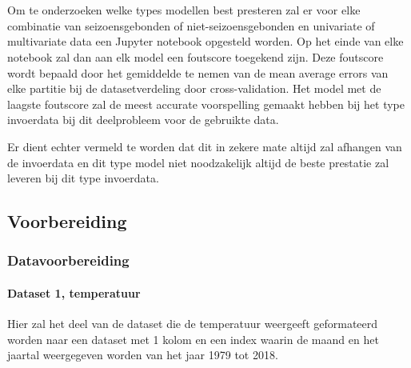 \chapter{}
\label{ch:methodologie}

Om te onderzoeken welke types modellen best presteren zal er voor elke combinatie van seizoensgebonden of niet-seizoensgebonden en univariate of multivariate data een Jupyter notebook opgesteld worden. Op het einde van elke notebook zal dan aan elk model een foutscore toegekend zijn. Deze foutscore wordt bepaald door het gemiddelde te nemen van de mean average errors van elke partitie bij de datasetverdeling door cross-validation. Het model met de laagste foutscore zal de meest accurate voorspelling gemaakt hebben bij het type invoerdata bij dit deelprobleem voor de gebruikte data. 

Er dient echter vermeld te worden dat dit in zekere mate altijd zal afhangen van de invoerdata en dit type model niet noodzakelijk altijd de beste prestatie zal leveren bij dit type invoerdata.

\section{Voorbereiding}
\subsection{Datavoorbereiding}
\subsubsection{Dataset 1, temperatuur}
Hier zal het deel van de dataset die de temperatuur weergeeft geformateerd worden  naar een dataset met 1 kolom en een index waarin de maand en het jaartal weergegeven worden van het jaar 1979 tot 2018.

